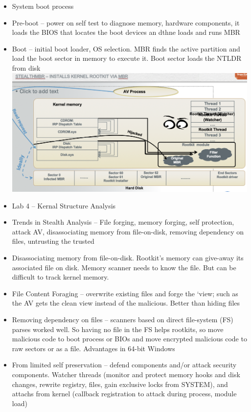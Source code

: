 \documentclass[12pt]{article}
\begin{document}
\begin{itemize}
\item System boot process
\item Pre-boot – power on self test to diagnose memory, hardware components, it loads the BIOS that locates the boot devices an dthne loads and runs MBR
\item Boot – initial boot loader, OS selection. MBR finds the active partition and load the boot sector in memory to execute it. Boot sector loads the NTLDR from disk 
\includegraphics{8.png}
\item Lab 4 – Kernal Structure Analysis
\item Trends in Stealth Analysis – File forging, memory forging, self protection, attack AV, disassociating memory from file-on-disk, removing dependency on files, untrusting the trusted
\item Disassociating memory from file-on-disk. Rootkit’s memory can give-away its associated file on disk. Memory scanner needs to know the file. But can be difficult to track kernel memory.
\item File Content Foraging – overwrite existing files and forge the ‘view; such as the AV gets the clean view instead of the malicious. Better than hiding files
\item Removing dependency on files – scanners based on direct file-system (FS) parses worked well. So having no file in the FS helps rootkits, so move malicious code to boot process or BIOs and move encrypted malicious code to raw sectors or as a file. Advantages in 64-bit Windows
\item From limited self preservation – defend components and/or attack security components. Watcher threads (monitor and protect memory hooks and disk changes, rewrite registry, files, gain exclusive locks from SYSTEM), and attachs from kernel (callback registration to attack during process, module load)

\end{itemize}
\end{document}
